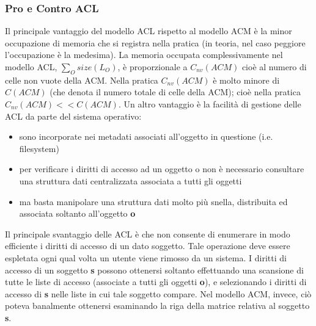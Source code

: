 \subsubsection{Pro e Contro ACL}
Il principale vantaggio del modello ACL rispetto al modello ACM è la minor occupazione di memoria che si registra nella pratica (in teoria, nel caso peggiore l’occupazione è la medesima). La memoria occupata complessivamente nel modello ACL, $\sum_{O} size(L_{O})$, è proporzionale a $C_{nv} (ACM)$ cioè al numero di celle non vuote della ACM. Nella pratica $C_{nv} (ACM)$ è molto minore di $C (ACM)$ (che denota il numero totale di celle della ACM); cioè nella pratica $C_{nv} (ACM)<<C (ACM)$. Un altro vantaggio è la facilità di gestione delle ACL da parte del sistema operativo:
\begin{itemize} 
  \item sono incorporate nei metadati associati all’oggetto in questione (i.e. filesystem)
  \item per verificare i diritti di accesso ad un oggetto o non è necessario consultare una struttura dati centralizzata associata a tutti gli oggetti
  \item ma basta manipolare una struttura dati molto più snella, distribuita ed associata soltanto all’oggetto \textbf{o}
\end{itemize}

Il principale svantaggio delle ACL è che non consente di enumerare in modo efficiente i diritti di accesso di un dato soggetto. Tale operazione deve essere espletata ogni qual volta un utente viene rimosso da un sistema. I diritti di accesso di un soggetto \textbf{s} possono ottenersi soltanto effettuando una scansione di tutte le liste di accesso (associate a tutti gli oggetti \textbf{o}), e selezionando i diritti di accesso di \textbf{s} nelle liste in cui tale soggetto compare. Nel modello ACM, invece, ciò poteva banalmente ottenersi esaminando la
riga della matrice relativa al soggetto \textbf{s}.

